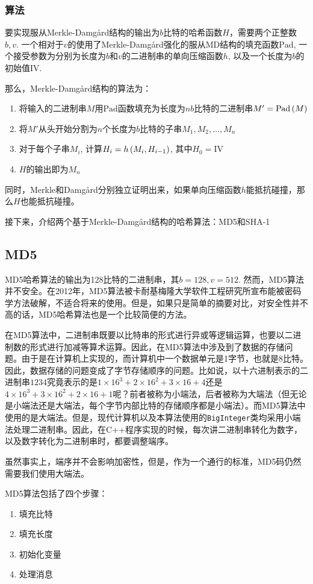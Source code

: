 \subsubsection{算法}
要实现服从Merkle-Damg\aa rd结构的输出为$b$比特的哈希函数$H$，需要两个正整数$b, v$. 一个相对于$v$的使用了Merkle-Damg\aa rd强化的服从MD结构的填充函数$\mathrm{Pad}$, 一个接受参数为分别为长度为$b$和$v$的二进制串的单向压缩函数$h$, 以及一个长度为$b$的初始值$\mathrm{IV}$.\par
那么，Merkle-Damg\aa rd结构的算法为：
\begin{enumerate}
	\item 将输入的二进制串$M$用$\mathrm{Pad}$函数填充为长度为$nb$比特的二进制串$M'=\mathrm{Pad}\left( {M}\right)$
	\item 将$M'$从头开始分割为$n$个长度为$b$比特的子串$M_1, M_2, \ldots, M_n$
	\item 对于每个子串$M_i$, 计算$H_i=h\left( {M_i, H_{i-1}}\right)$, 其中$H_0=\mathrm{IV}$
	\item $H$的输出即为$M_n$
\end{enumerate}

同时，Merkle和Damg\aa rd分别独立证明出来，如果单向压缩函数$h$能抵抗碰撞，那么$H$也能抵抗碰撞。\par
接下来，介绍两个基于Merkle-Damg\aa rd结构的哈希算法：MD5和SHA-1
\subsection{MD5}
MD5哈希算法的输出为128比特的二进制串，其$b=128, v=512$. 然而，MD5算法并不安全。在2012年，MD5算法被卡耐基梅隆大学软件工程研究所宣布能被密码学方法破解，不适合将来的使用。但是，如果只是简单的摘要对比，对安全性并不高的话，MD5哈希算法也是一个比较简便的方法。\par
在MD5算法中，二进制串既要以比特串的形式进行异或等逻辑运算，也要以二进制数的形式进行加减等算术运算。因此，在MD5算法中涉及到了数据的存储问题。由于是在计算机上实现的，而计算机中一个数据单元是1字节，也就是8比特。因此，数据存储的问题变成了字节存储顺序的问题。比如说，以十六进制表示的二进制串$1234$究竟表示的是$1\times 16^3+2\times 16^2+3\times 16+4$还是$4\times 16^3+3\times 16^2+2\times 16+1$呢？前者被称为小端法，后者被称为大端法（但无论是小端法还是大端法，每个字节内部比特的存储顺序都是小端法）。而MD5算法中使用的是大端法。但是，现代计算机以及本算法使用的\verb`BigInteger`类均采用小端法处理二进制串。因此，在C++程序实现的时候，每次讲二进制串转化为数字，以及数字转化为二进制串时，都要调整端序。\par
虽然事实上，端序并不会影响加密性，但是，作为一个通行的标准，MD5码仍然需要我们使用大端法。\par
MD5算法包括了四个步骤：
\begin{enumerate}
	\item 填充比特
	\item 填充长度
	\item 初始化变量
	\item 处理消息
\end{enumerate}

